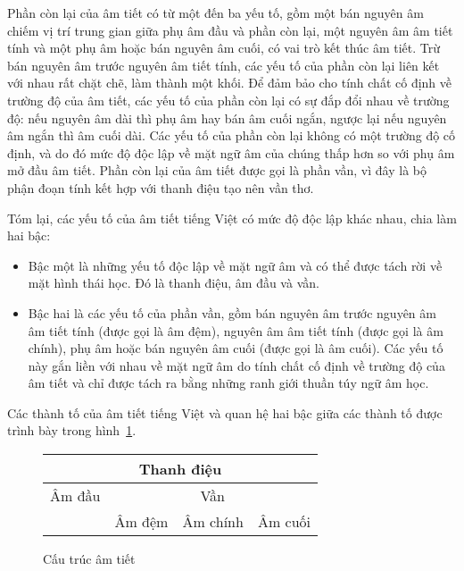 \documentclass[a4paper,oneside,14pt]{extbook} %
\begin{document}
Phần còn lại của âm tiết có từ một đến ba yếu tố, gồm một bán nguyên
âm chiếm vị trí trung gian giữa phụ âm đầu và phần còn lại, một nguyên
âm âm tiết tính và một phụ âm hoặc bán nguyên âm cuối, có vai trò kết
thúc âm tiết. Trừ bán nguyên âm trước nguyên âm tiết tính, các yếu tố
của phần còn lại liên kết với nhau rất chặt chẽ, làm thành một
khối. Để đảm bảo cho tính chất cố định về trường độ của âm tiết, các
yếu tố của phần còn lại có sự đắp đổi nhau về trường độ: nếu nguyên âm
dài thì phụ âm hay bán âm cuối ngắn, ngược lại nếu nguyên âm ngắn thì
âm cuối dài. Các yếu tố của phần còn lại không có một trường độ cố
định, và do đó mức độ độc lập về mặt ngữ âm của chúng thấp hơn so với
phụ âm mở đầu âm tiết. Phần còn lại của âm tiết được gọi là phần vần,
vì đây là bộ phận đoạn tính kết hợp với thanh điệu tạo nên vần thơ.

Tóm lại, các yếu tố của âm tiết tiếng Việt có mức độ độc lập khác
nhau, chia làm hai bậc:

\begin{itemize}
\item Bậc một là những yếu tố độc lập về mặt ngữ âm và có thể được
  tách rời về mặt hình thái học. Đó là thanh điệu, âm đầu và vần.
\item Bậc hai là các yếu tố của phần vần, gồm bán nguyên âm trước
  nguyên âm âm tiết tính (được gọi là âm đệm), nguyên âm âm tiết tính
  (được gọi là âm chính), phụ âm hoặc bán nguyên âm cuối (được gọi là
  âm cuối). Các yếu tố này gắn liền với nhau về mặt ngữ âm do tính
  chất cố định về trường độ của âm tiết và chỉ được tách ra bằng những
  ranh giới thuần túy ngữ âm học.
\end{itemize}

Các thành tố của âm tiết tiếng Việt và quan hệ hai bậc giữa các thành
tố được trình bày trong hình~\ref{fig:cautrucamtiet}.

\begin{figure}[htbp]
  \centering
  \begin{tabular}{|c|c|c|c|}
    \hline
    \multicolumn{4}{|c|}{Thanh điệu}\\\hline
    Âm đầu&\multicolumn{3}{c|}{Vần}\\\cline{2-4}
    &Âm đệm&Âm chính&Âm cuối\\\hline
  \end{tabular}
  \caption{Cấu trúc âm tiết}
  \label{fig:cautrucamtiet}
\end{figure}

\end{document}
